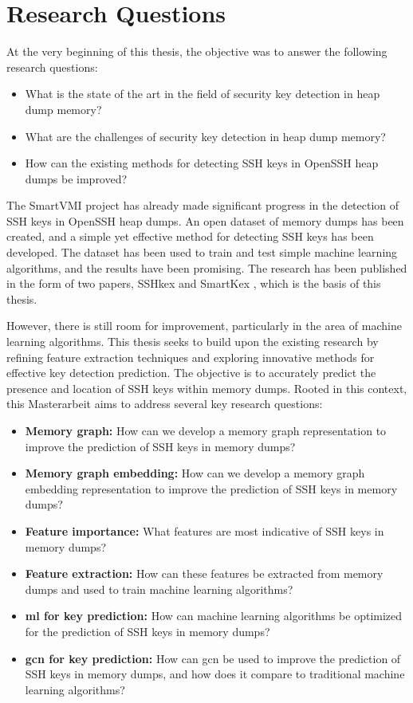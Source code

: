 \section{Research Questions}


At the very beginning of this thesis, the objective was to answer the following research questions:
\begin{itemize}
	\item What is the state of the art in the field of security key detection in heap dump memory?
	\item What are the challenges of security key detection in heap dump memory?
	\item How can the existing methods for detecting SSH keys in OpenSSH heap dumps be improved?
\end{itemize}

The SmartVMI project has already made significant progress in the detection of SSH keys in OpenSSH heap dumps. An open dataset of memory dumps has been created, and a simple yet effective method for detecting SSH keys has been developed. The dataset has been used to train and test simple machine learning algorithms, and the results have been promising. The research has been published in the form of two papers, SSHkex \cite{SSHkex22} and SmartKex \cite{SmartKex22}, which is the basis of this thesis. 

However, there is still room for improvement, particularly in the area of machine learning algorithms. This thesis seeks to build upon the existing research by refining feature extraction techniques and exploring innovative methods for effective key detection prediction. The objective is to accurately predict the presence and location of SSH keys within memory dumps. Rooted in this context, this Masterarbeit aims to address several key research questions:

\begin{itemize}
	\item \textbf{Memory graph:} How can we develop a memory graph representation to improve the prediction of SSH keys in memory dumps?
	\item \textbf{Memory graph embedding:} How can we develop a memory graph embedding representation to improve the prediction of SSH keys in memory dumps?
	\item \textbf{Feature importance:} What features are most indicative of SSH keys in memory dumps?
	\item \textbf{Feature extraction:} How can these features be extracted from memory dumps and used to train machine learning algorithms?
	\item \textbf{\acrshort{ml} for key prediction:} How can machine learning algorithms be optimized for the prediction of SSH keys in memory dumps? 
	\item \textbf{\acrlong{gcn} for key prediction:} How can \acrshort{gcn} be used to improve the prediction of SSH keys in memory dumps, and how does it compare to traditional machine learning algorithms?
\end{itemize}

